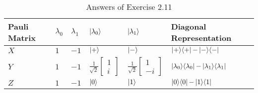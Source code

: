 \begin{table}[htb]
\def\arraystretch{2}%
\centering
\begin{tabular}{|P{10em}|P{2em}|P{2em}|P{4em}|P{4em}|P{10em}|}
\hline
Pauli Matrix & $\lambda_0$ & $\lambda_1$  & $\ket{\lambda_0}$ & $\ket{\lambda_1}$ & Diagonal Representation
\\ \hline
$X$ & $1$ & $-1$ & $\ket+$ & $\ket-$ & $\mathop{\mathinner{ |{+}\rangle \langle{+}|}} - \mathop{\mathinner{ |{-}\rangle \langle{-}|}}$
\\ \hline
$Y$ & $1$ & $-1$ & $\frac{1}{\sqrt2} \left[ \begin{matrix} 1 \\ i \end{matrix} \right]$ &
    $\frac{1}{\sqrt2} \left[ \begin{matrix} 1 \\ -i \end{matrix} \right]$ &
    $\mathop{\mathinner{ |{\lambda_0}\rangle \langle{\lambda_0}|}} - \mathop{\mathinner{ |{\lambda_1}\rangle \langle{\lambda_1}|}}$
\\ \hline
$Z$ & $1$ & $-1$ & $\ket0$ & $\ket1$ & $\mathop{\mathinner{ |{0}\rangle \langle{0}|}} - \mathop{\mathinner{ |{1}\rangle \langle{1}|}}$
\\ \hline
\end{tabular}
\caption{Answers of Exercise 2.11}
\label{tab:nielsen-and-chuang-answers-exercise-2-11}
\end{table}